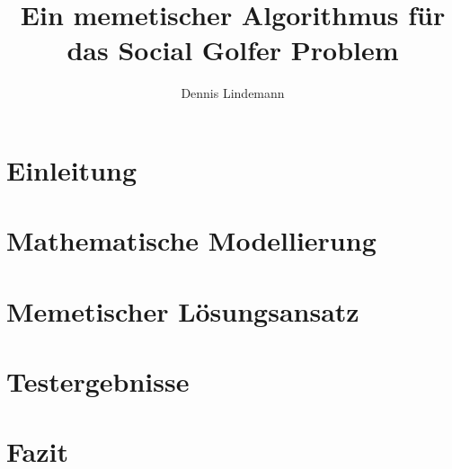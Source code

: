 \documentclass[draft]{tcs-seminar}
\begin{document}
\title{Ein memetischer Algorithmus für das Social Golfer Problem}
\author{Dennis Lindemann}

\begin{abstract}

\end{abstract}

\maketitle


\section{Einleitung}
  


\section{Mathematische Modellierung}
    


\section{Memetischer Lösungsansatz}
  

\section{Testergebnisse}
  


\section{Fazit}
  

\begin{thebibliography}{9}  
    
\end{thebibliography}
\end{document}
